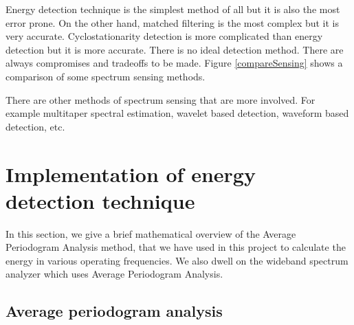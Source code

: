 Energy detection technique is the simplest method of all but it is also the 
most error prone. On the other hand, matched filtering is the most complex but 
it is very accurate. Cyclostationarity detection is more complicated than 
energy detection but it is more accurate. There is no ideal detection method.
There are always compromises and tradeoffs to be made. Figure 
\ref{compareSensing} shows a comparison of some spectrum sensing methods.

There are other methods of spectrum sensing that are more involved. For
example multitaper spectral estimation, wavelet based detection, waveform
based detection, etc.


\section{Implementation of energy detection technique}

In this section, we give a brief mathematical overview of the Average 
Periodogram Analysis method, that we have used in this project to calculate 
the energy in various operating frequencies. We also dwell on the wideband 
spectrum analyzer which uses Average Periodogram Analysis.

\subsection{Average periodogram analysis}

